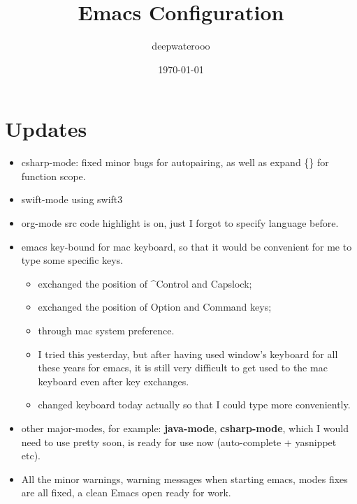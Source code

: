 \documentclass[9pt, b5paper]{article}
\author{deepwaterooo}
\date{\today}
\title{Emacs Configuration}
\begin{document}
\maketitle
\tableofcontents


\section{Updates}
\label{sec:org632f28d}
\begin{itemize}
\item csharp-mode: fixed minor bugs for autopairing, as well as expand \{\} for function scope.
\item swift-mode using swift3
\item org-mode src code highlight is on, just I forgot to specify language before.
\item emacs key-bound for mac keyboard, so that it would be convenient for me to type some specific keys. 
\begin{itemize}
\item exchanged the position of \^{}Control and Capslock;
\item exchanged the position of Option and Command keys;
\item through mac system preference.
\item I tried this yesterday, but after having used window's keyboard for all these years for emacs, it is still very difficult to get used to the mac keyboard even after key exchanges.
\item changed keyboard today actually so that I could type more conveniently.
\end{itemize}
\item other major-modes, for example: \textbf{java-mode}, \textbf{csharp-mode}, which I would need to use pretty soon, is ready for use now (auto-complete + yasnippet etc).
\item All the minor warnings, warning messages when starting emacs, modes fixes are all fixed, a clean Emacs open ready for work.
\end{itemize}
\end{document}
